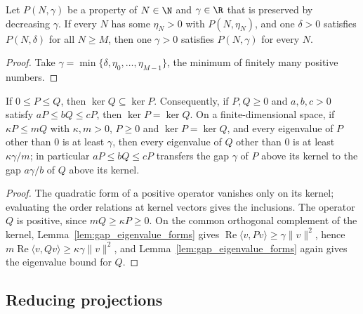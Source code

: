 \begin{lemma}
    \label{lem:gap_eventual_constant}
    \leanok
    Let $P(N,\gamma)$ be a property of $N\in\N$ and $\gamma\in\R$ that is preserved
    by decreasing $\gamma$. If every $N$ has some $\eta_N>0$ with $P(N,\eta_N)$, and
    one $\delta>0$ satisfies $P(N,\delta)$ for all $N\ge M$, then one $\gamma>0$
    satisfies $P(N,\gamma)$ for every $N$.
\end{lemma}
\begin{proof}\leanok
    Take $\gamma=\min\{\delta,\eta_0,\dots,\eta_{M-1}\}$, the minimum of finitely many
    positive numbers.
\end{proof}

\begin{lemma}
    \label{lem:gap_positive_comparison}
    \leanok
    If $0\le P\le Q$, then $\ker Q\subseteq\ker P$. Consequently, if $P,Q\ge0$ and
    $a,b,c>0$ satisfy $aP\le bQ\le cP$, then $\ker P=\ker Q$. On a finite-dimensional
    space, if $\kappa P\le mQ$ with $\kappa,m>0$, $P\ge0$ and $\ker P=\ker Q$, and every
    eigenvalue of $P$ other than $0$ is at least $\gamma$, then every eigenvalue of $Q$
    other than $0$ is at least $\kappa\gamma/m$; in particular $aP\le bQ\le cP$
    transfers the gap $\gamma$ of $P$ above its kernel to the gap $a\gamma/b$ of $Q$
    above its kernel.
\end{lemma}
\begin{proof}\leanok
    The quadratic form of a positive operator vanishes only on its kernel; evaluating
    the order relations at kernel vectors gives the inclusions. The operator $Q$ is
    positive, since $mQ\ge\kappa P\ge0$. On the common orthogonal complement of the
    kernel, Lemma~\ref{lem:gap_eigenvalue_forms} gives
    $\operatorname{Re}\langle v,Pv\rangle\ge\gamma\lVert v\rVert^2$, hence
    $m\operatorname{Re}\langle v,Qv\rangle\ge\kappa\gamma\lVert v\rVert^2$, and
    Lemma~\ref{lem:gap_eigenvalue_forms} again gives the eigenvalue bound for $Q$.
\end{proof}

\subsection{Reducing projections}
\label{sec:martingale_gaps_reducing}

